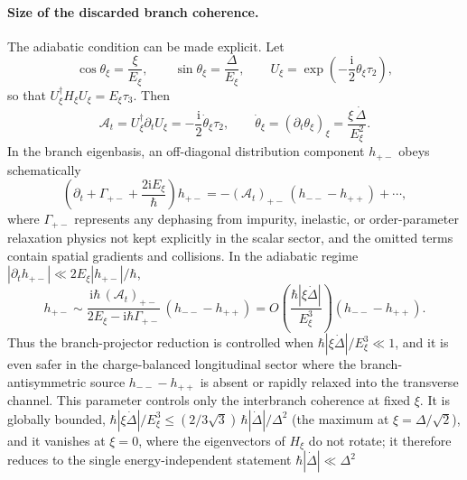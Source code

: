 \documentclass[
  aps,
  prb,
  preprint,
  superscriptaddress,
  longbibliography,
  nofootinbib
]{revtex4-2}
\newcommand{\ii}{\mathrm{i}}
\begin{document}
\paragraph{Size of the discarded branch coherence.} The adiabatic condition
can be made explicit. Let
\begin{equation}
  \cos\theta_\xi=\frac{\xi}{E_\xi},
  \qquad
  \sin\theta_\xi=\frac{\Delta}{E_\xi},
  \qquad
  U_\xi=\exp\!\left(-\frac{\ii}{2}\theta_\xi\tau_2\right),
  \label{eq:branch_rotation}
\end{equation}
so that \(U_\xi^\dagger H_\xi U_\xi=E_\xi\tau_3\). Then
\begin{equation}
  \mathcal A_t
  =
  U_\xi^\dagger\partial_t U_\xi
  =
  -\frac{\ii}{2}\dot\theta_\xi\tau_2,
  \qquad
  \dot\theta_\xi
  =
  \left(\partial_t\theta_\xi\right)_\xi
  =
  \frac{\xi\,\dot\Delta}{E_\xi^2}.
  \label{eq:branch_connection_size}
\end{equation}
In the branch eigenbasis, an off-diagonal distribution component
\(h_{+-}\) obeys schematically
\begin{equation}
  \left(
    \partial_t+\Gamma_{+-}+\frac{2\ii E_\xi}{\hbar}
  \right)h_{+-}
  =
  -(\mathcal A_t)_{+-}\,(h_{--}-h_{++})
  +\cdots ,
  \label{eq:branch_coherence_equation}
\end{equation}
where \(\Gamma_{+-}\) represents any dephasing from impurity, inelastic, or
order-parameter relaxation physics not kept explicitly in the scalar sector,
and the omitted terms contain spatial gradients and collisions. In the
adiabatic regime \(|\partial_t h_{+-}|\ll 2E_\xi|h_{+-}|/\hbar\),
\begin{equation}
  h_{+-}
  \sim
  \frac{\ii\hbar\,(\mathcal A_t)_{+-}}{2E_\xi-\ii\hbar\Gamma_{+-}}\,
  (h_{--}-h_{++})
  =
  O\!\left(
    \frac{\hbar|\xi\dot\Delta|}{E_\xi^3}
  \right)
  (h_{--}-h_{++}).
  \label{eq:branch_coherence_estimate}
\end{equation}
Thus the branch-projector reduction is controlled when
\(\hbar|\xi\dot\Delta|/E_\xi^3\ll1\), and it is even safer in the
charge-balanced longitudinal sector where the branch-antisymmetric source
\(h_{--}-h_{++}\) is absent or rapidly relaxed into the transverse channel.
This parameter controls only the interbranch coherence at fixed \(\xi\).
It is globally bounded,
\(\hbar|\xi\dot\Delta|/E_\xi^3\le(2/3\sqrt3)\,\hbar|\dot\Delta|/\Delta^2\)
(the maximum at \(\xi=\Delta/\sqrt2\)), and it vanishes at \(\xi=0\),
where the eigenvectors of \(H_\xi\) do not rotate; it therefore reduces to
the single energy-independent statement \(\hbar|\dot\Delta|\ll\Delta^2\)
\end{document}
